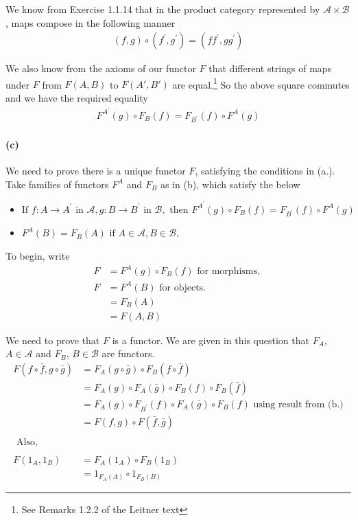 \documentclass{article}
\begin{document}
We know from Exercise 1.1.14 that in the product category represented by $\mathcal{A} \times \mathcal{B}$, maps compose in the following manner
\begin{align*}
  (f, g) \circ (f^{\prime},g^{\prime}) = (ff^{\prime}, gg^{\prime})
\end {align*}

We also know from the axioms of our functor $F$ that different strings of maps under $F$ from $F(A,B)$ to $F(A',B')$ are equal.\footnote{See Remarks 1.2.2 of the Leitner text} So the above square commutes and we have the required equality
\begin{align*}
  F^{A^{\prime}}(g) \circ F_B(f) = F_{B^\prime}(f) \circ F^A(g)
\end{align*}

\paragraph{(c)}

We need to prove there is a unique functor $F$, satisfying the conditions in (a.). Take families of functors $F^A$ and $F_B$ as in (b), which satisfy the below

\begin{itemize}
\item $ \text{If }f\colon A \rightarrow A^{\prime} \text{ in } \mathcal{A}, g\colon B \rightarrow B^{\prime} \text{ in } \mathcal{B}, \text{ then } F^{A^{\prime}}(g) \circ F_B(f) = F_{B^\prime}(f) \circ F^A(g)$
\item $F^A(B) = F_B(A) \text{ if } A \in \mathcal{A}, B \in \mathcal{B},$
\end{itemize}

To begin, write
\begin{align*}
  F &= F^A(g) \circ F_B(f) \text{ for morphisms, } \\
  F & =F^A(B) \text{ for objects. } \\
    & =F_B(A) \\
    & = F(A,B)
\end{align*}

We need to prove that $F$ is a functor. We are given in this question that $F_A$, $A \in \mathcal{A}$ and $F_B$, $B \in \mathcal{B}$ are functors.
\begin{align*}
  F(f \circ \bar{f}, g \circ \bar{g}) &= F_A(g \circ \bar{g}) \circ F_B(f \circ \bar{f}) \\
                                                &= F_A(g) \circ F_A(\bar{g}) \circ F_B(f) \circ F_B(\bar{f}) \\
                                                &= F_A(g) \circ F_{B^{\prime}}(f) \circ F_A(\bar{g}) \circ F_B(f) \text{ using result from (b.)} \\
                                      &= F(f,g) \circ F(\bar{f}, \bar{g}) \\ \\
  \text { Also, } \\\\
  F(1_A,1_B) &= F_A(1_A) \circ F_B(1_B) \\
             &= 1_{F_A(A)} \circ 1_{F_B(B)}
\end{align*}
\end{document}

